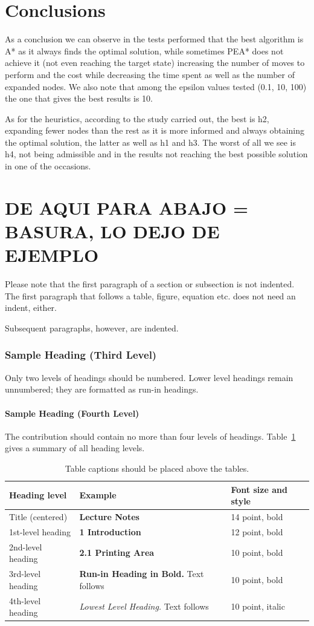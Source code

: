 \documentclass[runningheads]{llncs}
\begin{document}
\section{Conclusions}
As a conclusion we can observe in the tests performed that the best 
algorithm is A* as it always finds the optimal solution, while sometimes 
PEA* does not achieve it (not even reaching the target state) increasing 
the number of moves to perform and the cost while decreasing the time spent 
as well as the number of expanded nodes. We also note that among the epsilon 
values tested (0.1, 10, 100) the one that gives the best results is 10.

As for the heuristics, according to the study carried out, the best is h2, 
expanding fewer nodes than the rest as it is more informed and always obtaining 
the optimal solution, the latter as well as h1 and h3. The worst of all we 
see is h4, not being admissible and in the results not reaching the best possible 
solution in one of the occasions.

\section{DE AQUI PARA ABAJO = BASURA, LO DEJO DE EJEMPLO}
Please note that the first paragraph of a section or subsection is
not indented. The first paragraph that follows a table, figure,
equation etc. does not need an indent, either.

Subsequent paragraphs, however, are indented.

\subsubsection{Sample Heading (Third Level)} Only two levels of
headings should be numbered. Lower level headings remain unnumbered;
they are formatted as run-in headings.

\paragraph{Sample Heading (Fourth Level)}
The contribution should contain no more than four levels of
headings. Table~\ref{tab1} gives a summary of all heading levels.

\begin{table}
\caption{Table captions should be placed above the
tables.}\label{tab1}
\begin{tabular}{|l|l|l|}
\hline
Heading level &  Example & Font size and style\\
\hline
Title (centered) &  {\Large\bfseries Lecture Notes} & 14 point, bold\\
1st-level heading &  {\large\bfseries 1 Introduction} & 12 point, bold\\
2nd-level heading & {\bfseries 2.1 Printing Area} & 10 point, bold\\
3rd-level heading & {\bfseries Run-in Heading in Bold.} Text follows & 10 point, bold\\
4th-level heading & {\itshape Lowest Level Heading.} Text follows & 10 point, italic\\
\hline
\end{tabular}
\end{table}
\end{document}

